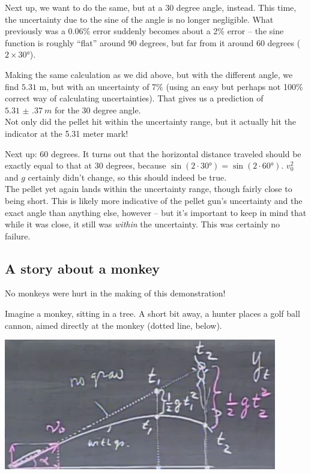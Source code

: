 \documentclass[8.01x]{subfiles}
\begin{document}
Next up, we want to do the same, but at a 30 degree angle, instead. This time, the uncertainty due to the sine of the angle is no longer negligible. What previously was a 0.06\% error suddenly becomes about a 2\% error -- the sine function is roughly ``flat'' around 90 degrees, but far from it around 60 degrees ($2 \times \ang{30}$).

Making the same calculation as we did above, but with the different angle, we find $5.31$ m, but with an uncertainty of 7\% (using an easy  but perhaps not 100\% correct way of calculating uncertainties). That gives us a prediction of $\SI{5.31(37)}{m}$ for the 30 degree angle.\\
Not only did the pellet hit within the uncertainty range, but it actually hit the indicator at the 5.31 meter mark!

Next up: 60 degrees. It turns out that the horizontal distance traveled should be exactly equal to that at 30 degrees, because $\sin({2\cdot\ang{30}}) = \sin({2\cdot\ang{60}})$. $v_0^2$ and $g$ certainly didn't change, so this should indeed be true.\\
The pellet yet again lands within the uncertainty range, though fairly close to being short. This is likely more indicative of the pellet gun's uncertainty and the exact angle than anything else, however -- but it's important to keep in mind that while it was close, it still was \emph{within} the uncertainty. This was certainly no failure.

\subsection{A story about a monkey}

No monkeys were hurt in the making of this demonstration!

Imagine a monkey, sitting in a tree. A short bit away, a hunter places a golf ball cannon, aimed directly at the monkey (dotted line, below).

\begin{center}
\includegraphics[scale=0.8]{Graphics/lec4_monkey}
\end{center}
\end{document}
